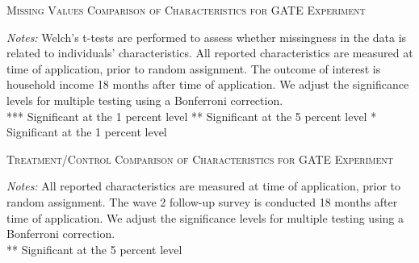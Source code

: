 

\begin{table}
\centering
\caption{\textsc{Missing Values Comparison of Characteristics for GATE Experiment}}
\begin{adjustbox}{width=\textwidth,totalheight=\textheight,keepaspectratio}

\end{adjustbox}


\label{tab:table_missing}
\medskip
\raggedright
\footnotesize
\textit{Notes:} Welch's t-tests are performed to assess whether missingness in the data is related to individuals' characteristics.
All reported characteristics are measured at time of application, prior to random assignment. The outcome of interest is household income 18 months after time of application. We adjust the significance levels for multiple testing using a Bonferroni correction. \\
*** Significant at the 1 percent level ** Significant at the 5 percent level * Significant at the 1 percent level
\end{table}

\begin{table}[t]
\centering
\caption{\textsc{Treatment/Control Comparison of Characteristics for GATE Experiment}}
\begin{adjustbox}{width=\textwidth, totalheight=\textheight, keepaspectratio}

\end{adjustbox}


\label{tab:table_integrity}
\medskip
\raggedright
\footnotesize
\textit{Notes:} All reported characteristics are measured at time of application, prior to random assignment. The wave 2 follow-up survey is conducted 18 months after time of application. We adjust the significance levels for multiple testing using a Bonferroni correction. \\
** Significant at the 5 percent level
\end{table}


